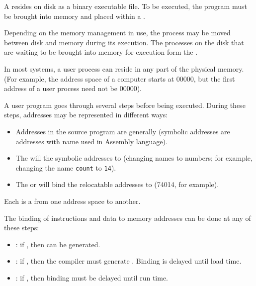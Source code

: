     \par A  resides on disk as a binary executable file. To be executed, the program must be brought into memory and placed within a .
    \par Depending on the memory management in use, the process may be moved between disk and memory during its execution. The processes on the disk that are waiting to be brought into memory for execution form the .
    \par In most systems, a user process can reside in any part of the physical memory. (For example, the address space of a computer starts at 00000, but the first address of a user process need not be 00000).
    \par A user program goes through several steps before being executed. During these steps, addresses may be represented in different ways:
    \begin{itemize}
      \item Addresses in the source program are generally  (symbolic addresses are addresses with name used in Assembly language).
      \item The  will  the symbolic addresses to  (changing names to numbers; for example, changing the name \texttt{count} to \texttt{14}).
      \item The  or  will bind the relocatable addresses to  (74014, for example).
    \end{itemize}
    \par Each  is a  from one address space to another.
    \par The binding of instructions and data to memory addresses can be done at any of these steps:
    \begin{itemize}
      \item {}: if , then  can be generated.
      \item {}: if , then the compiler must generate . Binding is delayed until load time.
      \item {}:  if , then binding must be delayed until run time.
    \end{itemize}

